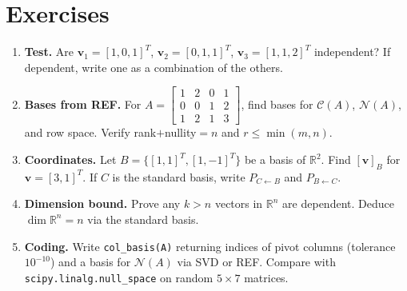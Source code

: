 \section{Exercises}
\label{sec:ch05-exercises}
\begin{enumerate}[label=E5.\arabic*, leftmargin=*, itemsep=0.8em]
\item \textbf{Test.} Are $\mathbf{v}_1=[1,0,1]^T$, $\mathbf{v}_2=[0,1,1]^T$, $\mathbf{v}_3=[1,1,2]^T$ independent? If dependent, write one as a combination of the others.
\item \textbf{Bases from REF.} For $A=\begin{bmatrix}1&2&0&1\\0&0&1&2\\1&2&1&3\end{bmatrix}$, find bases for $\mathcal{C}(A)$, $\mathcal{N}(A)$, and row space. Verify rank$+$nullity$=n$ and $r\le\min(m,n)$.
\item \textbf{Coordinates.} Let $B=\{[1,1]^T,[1,-1]^T\}$ be a basis of $\mathbb{R}^2$. Find $[\mathbf{v}]_B$ for $\mathbf{v}=[3,1]^T$. If $C$ is the standard basis, write $P_{C\gets B}$ and $P_{B\gets C}$.
\item \textbf{Dimension bound.} Prove any $k>n$ vectors in $\mathbb{R}^n$ are dependent. Deduce $\dim\mathbb{R}^n=n$ via the standard basis.
\item \textbf{Coding.} Write \texttt{col\_basis(A)} returning indices of pivot columns (tolerance $10^{-10}$) and a basis for $\mathcal{N}(A)$ via SVD or REF. Compare with \texttt{scipy.linalg.null\_space} on random $5\times7$ matrices.
\end{enumerate}
